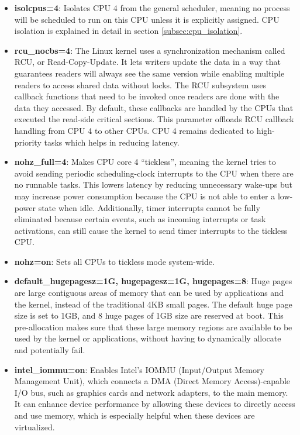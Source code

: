 \documentclass[MMR,Master,english]{twbook}
\begin{document}
\begin{itemize}
	\item \textbf{isolcpus=4}: Isolates CPU 4 from the general scheduler, meaning no process will be scheduled to run on this CPU unless it is explicitly assigned. CPU isolation is explained in detail in section \ref{subsec:cpu_isolation}.
	\item \textbf{rcu\_nocbs=4}: The Linux kernel uses a synchronization mechanism called RCU, or Read-Copy-Update. It lets writers update the data in a way that guarantees readers will always see the same version while enabling multiple readers to access shared data without locks. The RCU subsystem uses callback functions that need to be invoked once readers are done with the data they accessed. By default, these callbacks are handled by the CPUs that executed the read-side critical sections. This parameter offloads RCU callback handling from CPU 4 to other CPUs. CPU 4 remains dedicated to high-priority tasks which helps in reducing latency.
	\item \textbf{nohz\_full=4}: Makes CPU core 4 ``tickless'', meaning the kernel tries to avoid sending periodic scheduling-clock interrupts to the CPU when there are no runnable tasks. This lowers latency by reducing unnecessary wake-ups but may increase power consumption because the CPU is not able to enter a low-power state when idle. Additionally, timer interrupts cannot be fully eliminated because certain events, such as incoming interrupts or task activations, can still cause the kernel to send timer interrupts to the tickless CPU.	
	\item \textbf{nohz=on}: Sets all CPUs to tickless mode system-wide.
	\item \textbf{default\_hugepagesz=1G, hugepagesz=1G, hugepages=8}: Huge pages are large contiguous areas of memory that can be used by applications and the kernel, instead of the traditional 4KB small pages. The default huge page size is set to 1GB, and 8 huge pages of 1GB size are reserved at boot. This pre-allocation makes sure that these large memory regions are available to be used by the kernel or applications, without having to dynamically allocate and potentially fail.
	\item \textbf{intel\_iommu=on}: Enables Intel's IOMMU (Input/Output Memory Management Unit), which connects a DMA (Direct Memory Access)-capable I/O bus, such as graphics cards and network adapters, to the main memory. It can enhance device performance by allowing these devices to directly access and use memory, which is especially helpful when these devices are virtualized.

\end{itemize}
\end{document}
